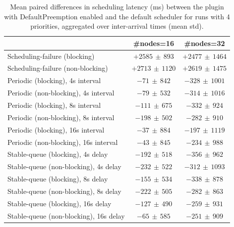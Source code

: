 \begin{table}[t]
\tiny
\setlength{\tabcolsep}{1.2pt}
\renewcommand{\arraystretch}{1.12}
\centering
\caption{Mean paired differences in scheduling latency (ms) between the plugin with DefaultPreemption enabled and the default scheduler for runs with 4 priorities, aggregated over inter-arrival times (mean \pm std).}
\label{tab:latency-defpreempt1-prio4-std1-agg-arrival}
\begin{tabular}{l c c}
\toprule
 & \#nodes=16 & \#nodes=32 \\
\midrule
Scheduling-failure (blocking) & $+2585\,\pm\,893$ & $+2477\,\pm\,1464$ \\
Scheduling-failure (non-blocking) & $+2713\,\pm\,1120$ & $+2619\,\pm\,1475$ \\
Periodic (blocking), 4s interval & $-71\,\pm\,842$ & $-328\,\pm\,1001$ \\
Periodic (non-blocking), 4s interval & $-79\,\pm\,532$ & $-314\,\pm\,1016$ \\
Periodic (blocking), 8s interval & $-111\,\pm\,675$ & $-332\,\pm\,924$ \\
Periodic (non-blocking), 8s interval & $-198\,\pm\,502$ & $-282\,\pm\,910$ \\
Periodic (blocking), 16s interval & $-37\,\pm\,884$ & $-197\,\pm\,1119$ \\
Periodic (non-blocking), 16s interval & $-43\,\pm\,845$ & $-234\,\pm\,988$ \\
Stable-queue (blocking), 4s delay & $-192\,\pm\,518$ & $-356\,\pm\,962$ \\
Stable-queue (non-blocking), 4s delay & $-232\,\pm\,522$ & $-312\,\pm\,1093$ \\
Stable-queue (blocking), 8s delay & $-155\,\pm\,534$ & $-338\,\pm\,878$ \\
Stable-queue (non-blocking), 8s delay & $-222\,\pm\,505$ & $-282\,\pm\,863$ \\
Stable-queue (blocking), 16s delay & $-127\,\pm\,490$ & $-259\,\pm\,931$ \\
Stable-queue (non-blocking), 16s delay & $-65\,\pm\,585$ & $-251\,\pm\,909$ \\
\bottomrule
\end{tabular}
\end{table}
